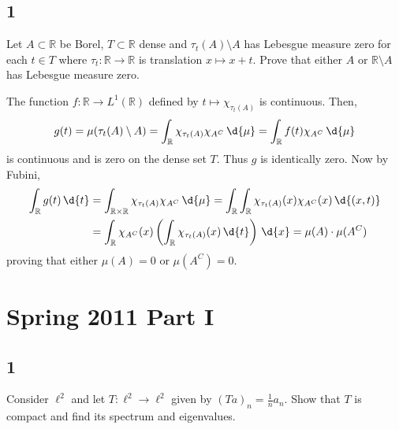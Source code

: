 \documentclass[12pt]{article}
\newcommand{\R}{\mathbb{R}}
\begin{document}
\subsection{1}

\begin{exercise}
Let $A \subset \R$ be Borel, $T \subset \R$ dense and $\tau_t(A) \setminus A$ has Lebesgue measure zero for each $t \in T$ where $\tau_t : \R \to \R$ is translation $x \mapsto x + t$. Prove that either $A$ or $\R \setminus A$ has Lebesgue measure zero. 
\end{exercise}

The function $f : \R \to L^1(\R)$ defined by $t \mapsto \chi_{\tau_t(A)}$ is continuous. Then,
\[ g(t) = \mu(\tau_t(A) \setminus A) = \int_\R \chi_{\tau_t(A)} \chi_{A^C} \, \d{\mu} = \int_\R f(t) \chi_{A^C} \, \d{\mu} \]
is continuous and is zero on the dense set $T$. Thus $g$ is identically zero. Now by Fubini,
\begin{align*}
\int_\R g(t) \, \d{t} & = \int_{\R \times \R} \chi_{\tau_t(A)} \chi_{A^C} \, \d{\mu} = \int_{\R} \int_{\R} \chi_{\tau_t(A)}(x) \chi_{A^C}(x) \, \d{(x, t)}
\\
&  = \int_\R \chi_{A^C}(x) \left( \int_\R \chi_{\tau_t(A)}(x) \, \d{t} \right) \, \d{x} = \mu(A) \cdot \mu(A^C)
\end{align*}
proving that either $\mu(A) = 0$ or $\mu(A^C) = 0$.

\section{Spring 2011 Part I}

\subsection{1}

\begin{exercise}

Consider $\ell^2$ and let $T : \ell^2 \to \ell^2$ given by $(T a)_n = \frac{1}{n} a_n$. Show that $T$ is compact and find its spectrum and eigenvalues.
\end{exercise}
\end{document}
